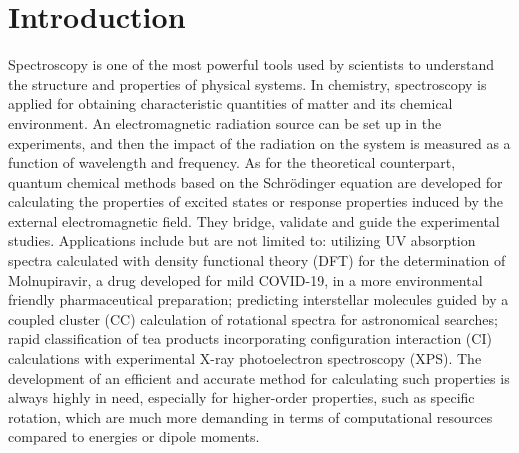 \chapter{Introduction}  \label{intro} 
Spectroscopy is one of the most powerful tools used by scientists to understand the structure and properties of physical systems. In chemistry, spectroscopy is applied for obtaining characteristic quantities of matter and its chemical environment. An electromagnetic radiation source can be set up in the experiments, and then the impact of the radiation on the system is measured as a function of wavelength and frequency.\cite{Svanberg2023} As for the theoretical counterpart, quantum chemical methods based on the Schr\"odinger equation are developed for calculating the properties of excited states or response properties induced by the external electromagnetic field.\cite{Szabo2012, Helgaker2013} They bridge, validate and guide the experimental studies. Applications include but are not limited to: utilizing UV absorption spectra calculated with density functional theory (DFT) for the determination of Molnupiravir, a drug developed for mild COVID-19, in a more environmental friendly pharmaceutical preparation;\cite{Abdelazim2023} predicting interstellar molecules guided by a coupled cluster (CC) calculation of rotational spectra for astronomical searches;\cite{Puzzarini2023} rapid classification of tea products incorporating configuration interaction (CI) calculations with experimental X-ray photoelectron spectroscopy (XPS).\cite{Jiang2022} The development of an efficient and accurate method for calculating such properties is always highly in need, especially for higher-order properties, such as specific rotation, which are much more demanding in terms of computational resources compared to energies or dipole moments.\cite{Pecul2005, Crawford2007, Bohle2021}

